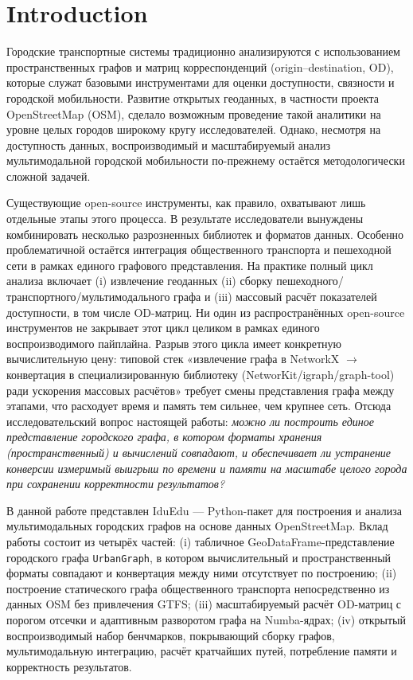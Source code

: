 \documentclass[sigconf,nonacm]{acmart}
\begin{document}
    \maketitle


    \section{Introduction}
    Городские транспортные системы традиционно анализируются с использованием пространственных графов и матриц
    корреспонденций (origin–destination, OD), которые служат базовыми инструментами для оценки доступности, связности
    и городской мобильности.
    Развитие открытых геоданных, в частности проекта OpenStreetMap (OSM), сделало возможным проведение такой аналитики на
    уровне целых городов широкому кругу исследователей.
    Однако, несмотря на доступность данных, воспроизводимый и масштабируемый анализ мультимодальной городской мобильности
    по-прежнему остаётся методологически сложной задачей.

    Существующие open-source инструменты, как правило, охватывают лишь отдельные этапы этого процесса.
    В результате исследователи вынуждены комбинировать несколько разрозненных библиотек и форматов данных.
    Особенно проблематичной остаётся интеграция общественного транспорта и пешеходной сети в рамках единого графового представления.
    На практике полный цикл анализа включает (i) извлечение геоданных (ii) сборку пешеходного/транспортного/мультимодального
    графа и (iii) массовый расчёт показателей доступности, в том числе OD-матриц.
    Ни один из распространённых open-source инструментов не закрывает этот цикл целиком в рамках единого воспроизводимого пайплайна.
    Разрыв этого цикла имеет конкретную вычислительную цену: типовой стек «извлечение графа в NetworkX $\to$
    конвертация в специализированную библиотеку (NetworKit/igraph/graph-tool) ради ускорения массовых расчётов»
    требует смены представления графа между этапами, что расходует время и память тем сильнее, чем крупнее сеть.
    Отсюда исследовательский вопрос настоящей работы: \emph{можно ли построить единое представление городского графа,
        в котором форматы хранения (пространственный) и вычислений совпадают, и обеспечивает ли устранение конверсии
        измеримый выигрыш по времени и памяти на масштабе целого города при сохранении корректности результатов?}

    В данной работе представлен IduEdu — Python-пакет для построения и анализа мультимодальных городских графов на основе данных OpenStreetMap.
    Вклад работы состоит из четырёх частей: (i) табличное GeoDataFrame-представление городского графа \texttt{UrbanGraph},
    в котором вычислительный и пространственный форматы совпадают и конвертация между ними отсутствует по построению;
    (ii) построение статического графа общественного транспорта непосредственно из данных OSM без привлечения GTFS;
    (iii) масштабируемый расчёт OD-матриц с порогом отсечки и адаптивным разворотом графа на Numba-ядрах;
    (iv) открытый воспроизводимый набор бенчмарков, покрывающий сборку графов, мультимодальную интеграцию,
    расчёт кратчайших путей, потребление памяти и корректность результатов.
\end{document}
